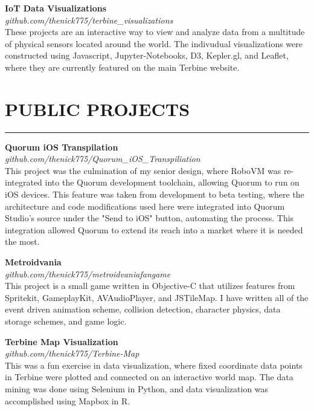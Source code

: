 \documentclass{res}
\begin{document}
\begin{resume}
		{\bf IoT Data Visualizations} \\
    \emph{github.com/thenick775/terbine\_visualizations} \hfill \vspace{4pt}\\
			These projects are an interactive way to view and analyze data from a multitude of physical sensors located around the world. The indivudual visualizations were constructed using Javascript, Jupyter-Notebooks, D3, Kepler.gl, and Leaflet, where they are currently featured on the main Terbine website.

\vspace{-3pt}

		\section{{PUBLIC PROJECTS}}
    \noindent\rule[0.5ex]{\linewidth}{1pt}
		{\bf Quorum iOS Transpilation} \\
			\emph{github.com/thenick775/Quorum\_iOS\_Transpiliation} \hfill \vspace{2.5pt}\\
			This project was the culmination of my senior design, where RoboVM was re-integrated into the Quorum development toolchain, allowing Quorum to run on iOS devices. This feature was taken from development to beta testing, where the architecture and code modifications used here were integrated into Quorum Studio's source under the "Send to iOS" button, automating the process. This integration allowed Quorum to extend its reach into a market where it is needed the most.
\vspace{-5pt}

		{\bf Metroidvania} \\
			\emph{github.com/thenick775/metroidvaniafangame} \hfill \vspace{3pt} \\
			This project is a small game written in Objective-C that utilizes features from Spritekit, GameplayKit, AVAudioPlayer, and JSTileMap. I have written all of the event driven animation scheme, collision detection, character physics, data storage schemes, and game logic.
\vspace{-4pt}

		{\bf Terbine Map Visualization} \\
			\emph{github.com/thenick775/Terbine-Map} \hfill \vspace{3pt} \\
			This was a fun exercise in data visualization, where fixed coordinate data points in Terbine were plotted and connected on an interactive world map. The data mining was done using Selenium in Python, and data visualization was accomplished using Mapbox in R.


\end{resume}
\end{document}
